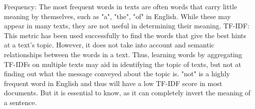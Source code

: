 Frequency: The most frequent words in texts are often words that carry little meaning by themselves, such as "a", "the", "of" in English.
While these may appear in many texts, they are not useful in determining their meaning.
TF-IDF: This metric has been used successfully to find the words that give the best hints at a text's topic.
However, it does not take into account and semantic relationships between the words in a text.
Thus, learning words by aggregating TF-IDFs on multiple texts may aid in identifying the topic of texts, but not at finding out what the message conveyed about the topic is.
"not" is a highly frequent word in English and thus will have a low TF-IDF score in most documents. But it is essential to know, as it can completely invert the meaning of a sentence.


